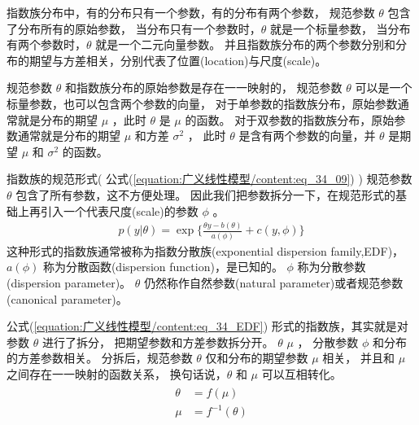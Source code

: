 \documentclass[letterpaper,10pt,english]{sphinxmanual}
\begin{document}
指数族分布中，有的分布只有一个参数，有的分布有两个参数，
规范参数 \(\theta\) 包含了分布所有的原始参数，
当分布只有一个参数时，\(\theta\)  就是一个标量参数，
当分布有两个参数时，\(\theta\) 就是一个二元向量参数。
并且指数族分布的两个参数分别和分布的期望与方差相关，分别代表了位置(location)与尺度(scale)。

规范参数 \(\theta\) 和指数族分布的原始参数是存在一一映射的，
规范参数 \(\theta\) 可以是一个标量参数，也可以包含两个参数的向量，
对于单参数的指数族分布，原始参数通常就是分布的期望 \(\mu\) ，此时 \(\theta\) 是 \(\mu\) 的函数。
对于双参数的指数族分布，原始参数通常就是分布的期望 \(\mu\) 和方差 \(\sigma^2\) ，
此时 \(\theta\) 是含有两个参数的向量，并 \(\theta\) 是期望 \(\mu\) 和 \(\sigma^2\) 的函数。

指数族的规范形式( 公式(\ref{equation:广义线性模型/content:eq_34_09}) ) 规范参数 \(\theta\) 包含了所有参数，这不方便处理。
因此我们把参数拆分一下，在规范形式的基础上再引入一个代表尺度(scale)的参数 \(\phi\)
。
\begin{equation}\label{equation:广义线性模型/content:eq_34_EDF}
\begin{split}p(y|\theta) = \exp \{\frac{\theta y - b(\theta)}{a(\phi)} + c(y,\phi)\}\end{split}
\end{equation}
这种形式的指数族通常被称为指数分散族(exponential dispersion family,EDF)，
\(a(\phi)\) 称为分散函数(dispersion function)，是已知的。
\(\phi\) 称为分散参数(dispersion parameter)。
\(\theta\) 仍然称作自然参数(natural parameter)或者规范参数(canonical parameter)。

公式(\ref{equation:广义线性模型/content:eq_34_EDF}) 形式的指数族，其实就是对参数 \(\theta\) 进行了拆分，
把期望参数和方差参数拆分开。
 \(\theta\)  \(\mu\)  ，
分散参数 \(\phi\) 和分布的方差参数相关。
分拆后，规范参数
\(\theta\) 仅和分布的期望参数 \(\mu\) 相关，
并且和 \(\mu\) 之间存在一一映射的函数关系，
换句话说，\(\theta\) 和 \(\mu\) 可以互相转化。
\begin{align}\label{equation:广义线性模型/content:广义线性模型/content:2}\!\begin{aligned}
\theta &=f(\mu)\\
\mu &= f^{-1}(\theta)\\
\end{aligned}\end{align}
\end{document}
